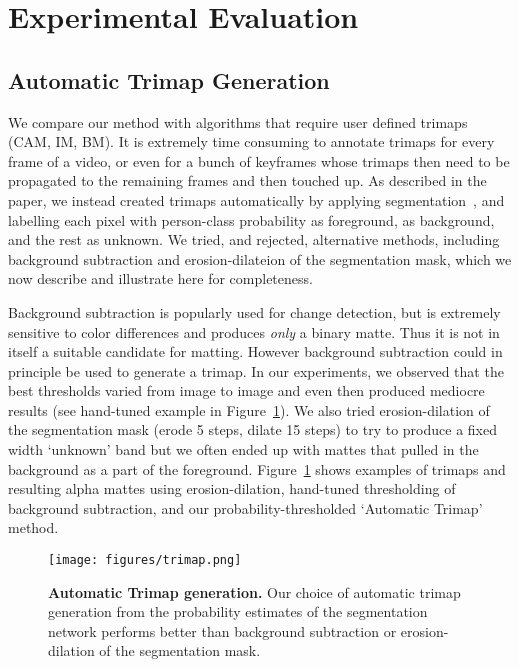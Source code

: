 \documentclass[10pt,twocolumn,letterpaper]{article}
\begin{document}
\section{Experimental Evaluation}

\subsection{Automatic Trimap Generation}
\label{sec:auto_tri}
We compare our method with algorithms that require user defined trimaps (CAM, IM, BM). It is extremely time consuming to annotate trimaps for every frame of a video, or even for a bunch of keyframes whose trimaps then need to be propagated to the remaining frames and then touched up. As described in the paper, we instead created trimaps automatically by applying segmentation~\cite{deeplabv3plus2018}, and labelling each pixel with person-class probability  as foreground,  as background, and the rest as unknown. We tried, and rejected, alternative methods, including background subtraction and erosion-dilateion of the segmentation mask, which we now describe and illustrate here for completeness.

Background subtraction is popularly used for change detection, but is extremely sensitive to color differences and produces \textit{only} a binary matte. Thus it is not in itself a suitable candidate for matting. However background subtraction could in principle be used to generate a trimap. In our experiments, we observed that the best thresholds varied from image to image and even then produced mediocre results (see hand-tuned example in Figure~\ref{fig:trimap}). We also tried erosion-dilation of the segmentation mask (erode 5 steps, dilate 15 steps) to try to produce a fixed width `unknown' band but we often ended up with mattes that pulled in the background as a part of the foreground. Figure~\ref{fig:trimap} shows examples of trimaps and resulting alpha mattes using erosion-dilation, hand-tuned thresholding of background subtraction, and our probability-thresholded `Automatic Trimap' method.

\begin{figure}[!ht]
	\centering
	\texttt{[image: figures/trimap.png]}    \caption{\small \textbf{Automatic Trimap generation.} Our choice of automatic trimap generation from the probability estimates of the segmentation network performs better than background subtraction or erosion-dilation of the segmentation mask.} 
\label{fig:trimap}
\end{figure}
\end{document}
